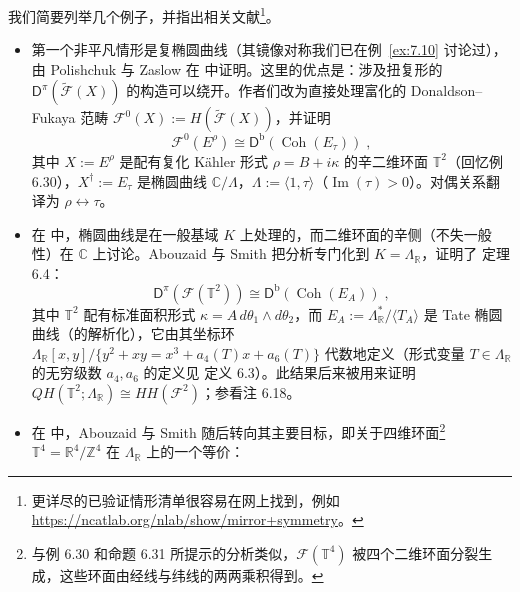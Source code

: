 \begin{Ex}\label{ex:7.28}
我们简要列举几个例子，并指出相关文献\footnote{更详尽的已验证情形清单很容易在网上找到，例如 \url{https://ncatlab.org/nlab/show/mirror+symmetry}。}。
\begin{itemize}
  \item 第一个非平凡情形是复椭圆曲线（其镜像对称我们已在例~\ref{ex:7.10} 讨论过），由 Polishchuk 与 Zaslow 在 \cite{PZ00} 中证明。这里的优点是：涉及扭复形的 $\mathsf D^\pi(\widetilde{\mathcal F}(X))$ 的构造可以绕开。作者们改为直接处理富化的 Donaldson–Fukaya 范畴 $\mathcal F^0(X):=H(\widetilde{\mathcal F}(X))$，并证明
  \begin{equation}\label{eq:7.115}
  \mathcal F^0(E^\rho)\cong\mathsf D^{\mathrm b}(\operatorname{Coh}(E_\tau))\;,
  \end{equation}
  其中 $X:=E^\rho$ 是配有复化 Kähler 形式 $\rho=B+i\kappa$ 的辛二维环面 $\mathbb T^2$（回忆例 6.30），$X^\dagger:=E_\tau$ 是椭圆曲线 $\mathbb C/\Lambda$，$\Lambda:=\langle1,\tau\rangle$（$\operatorname{Im}(\tau)>0$）。对偶关系翻译为 $\rho\leftrightarrow\tau$。
  \item 在 \cite{PZ00} 中，椭圆曲线是在一般基域 $K$ 上处理的，而二维环面的辛侧（不失一般性）在 $\mathbb C$ 上讨论。Abouzaid 与 Smith 把分析专门化到 $K=\Lambda_{\mathbb R}$，证明了 \cite{AS09} 定理 6.4：
  \begin{equation}\label{eq:7.116}
  \mathsf D^\pi(\mathcal F(\mathbb T^2))\cong\mathsf D^{\mathrm b}(\operatorname{Coh}(E_A))\;,
  \end{equation}
  其中 $\mathbb T^2$ 配有标准面积形式 $\kappa=A\,d\theta_1\wedge d\theta_2$，而 $E_A:=\Lambda_{\mathbb R}^*/\langle T_A\rangle$ 是 Tate 椭圆曲线（的解析化），它由其坐标环 $\Lambda_{\mathbb R}[x,y]/\{y^2+xy=x^3+a_4(T)x+a_6(T)\}$ 代数地定义（形式变量 $T\in\Lambda_{\mathbb R}$ 的无穷级数 $a_4,a_6$ 的定义见 \cite{AS09} 定义 6.3）。此结果后来被用来证明 $QH(\mathbb T^2;\Lambda_{\mathbb R})\cong HH(\mathcal F^2)$；参看注 6.18。
  \item 在 \cite{AS09} 中，Abouzaid 与 Smith 随后转向其主要目标，即关于四维环面\footnote{与例 6.30 和命题 6.31 所提示的分析类似，$\mathcal F(\mathbb T^4)$ 被四个二维环面分裂生成，这些环面由经线与纬线的两两乘积得到。} $\mathbb T^4=\mathbb R^4/\mathbb Z^4$ 在 $\Lambda_{\mathbb R}$ 上的一个等价：

\end{itemize}
\end{Ex}

